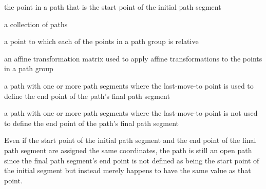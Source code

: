 %
the point in a path that is the start point of the initial path segment

%
a collection of paths

%
a point to which each of the points in a path group is relative

%
an affine transformation matrix used to apply affine transformations to the points in a path group

%
a path with one or more path segments where the last-move-to point is used to define the end point of the path's final path segment

%
a path with one or more path segments where the last-move-to point is not used to define the end point of the path's final path segment
\begin{note}
Even if the start point of the initial path segment and the end point of the final path segment are assigned the same coordinates, the path is still an open path since the final path segment's end point is not defined as being the start point of the initial segment but instead merely happens to have the same value as that point.
\end{note}
%
